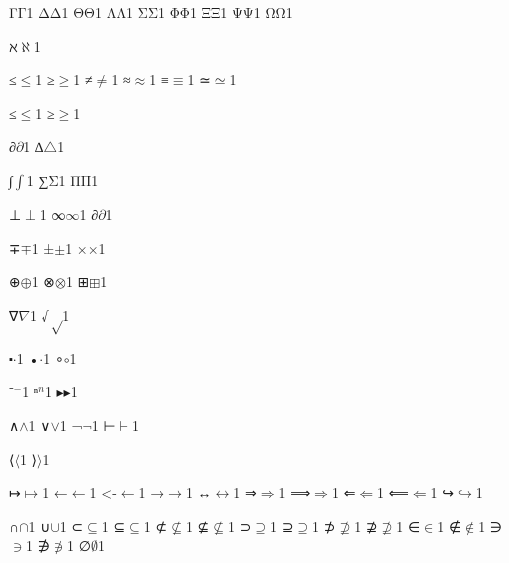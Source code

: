 {{Γ}{{\ensuremath{\mathrm{\Gamma}}}}1
{Δ}{{\ensuremath{\mathrm{\Delta}}}}1
{Θ}{{\ensuremath{\mathrm{\Theta}}}}1
{Λ}{{\ensuremath{\mathrm{\Lambda}}}}1
{Σ}{{\ensuremath{\mathrm{\Sigma}}}}1
{Φ}{{\ensuremath{\mathrm{\Phi}}}}1
{Ξ}{{\ensuremath{\mathrm{\Xi}}}}1
{Ψ}{{\ensuremath{\mathrm{\Psi}}}}1
{Ω}{{\ensuremath{\mathrm{\Omega}}}}1

{ℵ}{{\ensuremath{\aleph}}}1

{≤}{{\ensuremath{\leq}}}1
{≥}{{\ensuremath{\geq}}}1
{≠}{{\ensuremath{\neq}}}1
{≈}{{\ensuremath{\approx}}}1
{≡}{{\ensuremath{\equiv}}}1
{≃}{{\ensuremath{\simeq}}}1

{≤}{{\ensuremath{\leq}}}1
{≥}{{\ensuremath{\geq}}}1

{∂}{{\ensuremath{\partial}}}1
{∆}{{\ensuremath{\triangle}}}1 %

{∫}{{\ensuremath{\int}}}1
{∑}{{\ensuremath{\mathrm{\Sigma}}}}1
{Π}{{\ensuremath{\mathrm{\Pi}}}}1

{⊥}{{\ensuremath{\perp}}}1
{∞}{{\ensuremath{\infty}}}1
{∂}{{\ensuremath{\partial}}}1

{∓}{{\ensuremath{\mp}}}1
{±}{{\ensuremath{\pm}}}1
{×}{{\ensuremath{\times}}}1

{⊕}{{\ensuremath{\oplus}}}1
{⊗}{{\ensuremath{\otimes}}}1
{⊞}{{\ensuremath{\boxplus}}}1

{∇}{{\ensuremath{\nabla}}}1
{√}{{\ensuremath{\sqrt}}}1

{⬝}{{\ensuremath{\cdot}}}1
{•}{{\ensuremath{\cdot}}}1
{∘}{{\ensuremath{\circ}}}1

{⁻}{{\ensuremath{^{-}}}}1
{ⁿ}{\ensuremath{^{n}}}1
{▸}{{\ensuremath{\blacktriangleright}}}1

{∧}{{\ensuremath{\wedge}}}1
{∨}{{\ensuremath{\vee}}}1
{¬}{{\ensuremath{\neg}}}1
{⊢}{{\ensuremath{\vdash}}}1

{⟨}{{\ensuremath{\langle}}}1
{⟩}{{\ensuremath{\rangle}}}1

{↦}{{\ensuremath{\mapsto}}}1
{←}{{\ensuremath{\leftarrow}}}1
{<-}{{\ensuremath{\leftarrow}}}1
{→}{{\ensuremath{\rightarrow}}}1
{↔}{{\ensuremath{\leftrightarrow}}}1
{⇒}{{\ensuremath{\Rightarrow}}}1
{⟹}{{\ensuremath{\Longrightarrow}}}1
{⇐}{{\ensuremath{\Leftarrow}}}1
{⟸}{{\ensuremath{\Longleftarrow}}}1
{↪}{{\ensuremath{\hookrightarrow}}}1

{∩}{{\ensuremath{\cap}}}1
{∪}{{\ensuremath{\cup}}}1
{⊂}{{\ensuremath{\subseteq}}}1
{⊆}{{\ensuremath{\subseteq}}}1
{⊄}{{\ensuremath{\nsubseteq}}}1
{⊈}{{\ensuremath{\nsubseteq}}}1
{⊃}{{\ensuremath{\supseteq}}}1
{⊇}{{\ensuremath{\supseteq}}}1
{⊅}{{\ensuremath{\nsupseteq}}}1
{⊉}{{\ensuremath{\nsupseteq}}}1
{∈}{{\ensuremath{\in}}}1
{∉}{{\ensuremath{\notin}}}1
{∋}{{\ensuremath{\ni}}}1
{∌}{{\ensuremath{\notni}}}1
{∅}{{\ensuremath{\emptyset}}}1

}
